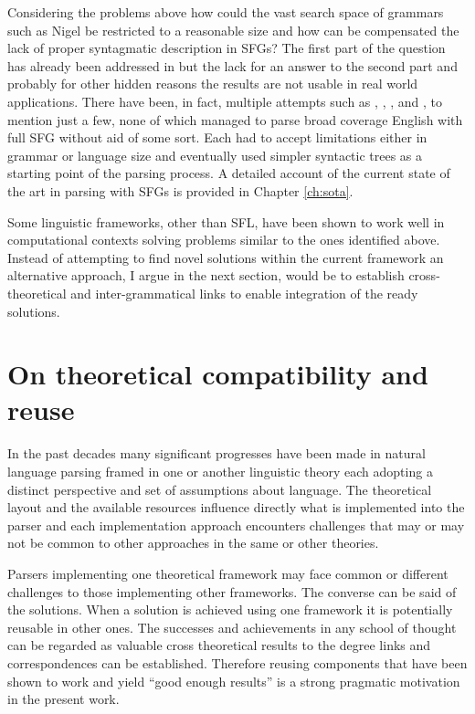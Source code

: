 Considering the problems above how could the vast search space of grammars such as Nigel be restricted to a reasonable size and how can be compensated the lack of proper syntagmatic description in SFGs? The first part of the question has already been addressed in \citet{ODonnell1993} but the lack for an answer to the second part and probably for other hidden reasons the results are not usable in real world applications. There have been, in fact, multiple attempts such as \citet{Kasper1988}, \citet{Kay1985}, \citet{ODonoghue1991a}, \citet{ODonnell1993} and \citet{Day2007}, to mention just a few, none of which managed to parse broad coverage English with full SFG without aid of some sort. Each had to accept limitations either in grammar or language size and eventually used simpler syntactic trees as a starting point of the parsing process. A detailed account of the current state of the art in parsing with SFGs is provided in Chapter \ref{ch:sota}. 

Some linguistic frameworks, other than SFL, have been shown to work well in computational contexts solving problems similar to the ones identified above. Instead of attempting to find novel solutions within the current framework an alternative approach, I argue in the next section, would be to establish cross-theoretical and inter-grammatical links to enable integration of the ready solutions.

\section{On theoretical compatibility and reuse}
\label{sec:reuse}
In the past decades many significant progresses have been made in natural language parsing framed in one or another linguistic theory each adopting a distinct perspective and set of assumptions about language. The theoretical layout and the available resources influence directly what is implemented into the parser and each implementation approach encounters challenges that may or may not be common to other approaches in the same or other theories. 

Parsers implementing one theoretical framework may face common or different challenges to those implementing other frameworks. The converse can be said of the solutions. When a solution is achieved using one framework it is potentially reusable in other ones. The successes and achievements in any school of thought can be regarded as valuable cross theoretical results to the degree links and correspondences can be established. Therefore reusing components that have been shown to work and yield ``good enough results'' is a strong pragmatic motivation in the present work.

